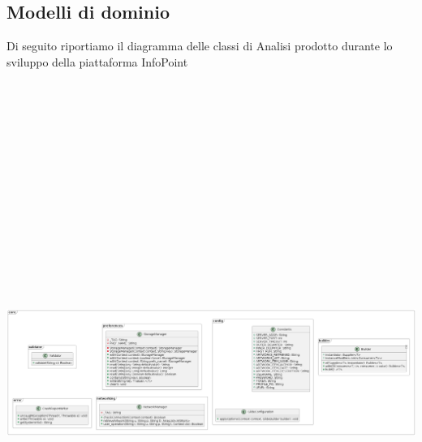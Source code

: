     \newpage
    \subsection{Modelli di dominio}
      \begin{center}

            Di seguito riportiamo il diagramma delle classi di Analisi prodotto durante lo sviluppo della piattaforma InfoPoint

            \includegraphics[width=19cm, height=19cm, keepaspectratio]{content/img/core.png}


\end{center}
